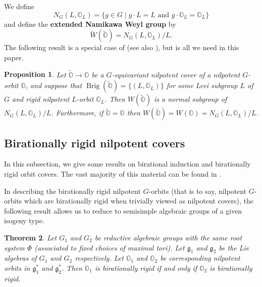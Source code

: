 \documentclass[11pt]{amsart}
\renewcommand{\O}{{\mathbb O}}
\newcommand{\g}{{\mathfrak g}}
\newcommand{\Brig}{\operatorname{Brig}}
\newcommand{\covO}{\widetilde{\O}}
\newtheorem{theorem}{Theorem}[section]
\newtheorem{prop}[theorem]{Proposition}
\numberwithin{equation}{section}
\begin{document}
	We define $$N_G(L,\O_L)=\{g\in G\mid g\cdot L=L\mbox{ and } g\cdot\O_L=\O_L\}$$ and define the {\bf extended Namikawa Weyl group} by $$\widetilde{W}(\covO)=N_G(L,\O_L)/L.$$ The following result is a special case of \cite[Proposition 7.2.2]{LMM} (see also \cite{Lo22}), but is all we need in this paper.
	
	\begin{prop}\label{p: NamW}
		Let $\covO\to \O$ be a $G$-equivariant nilpotent cover of a nilpotent $G$-orbit $\O$, and suppose that $\Brig(\covO)=\{(L,\O_L)\}$ for some Levi subgroup $L$ of $G$ and rigid nilpotent $L$-orbit $\O_L$. Then $W(\covO)$ is a normal subgroup of $N_G(L,\O_L)/L$. Furthermore, if $\covO=\O$ then $W(\covO)=W(\O)=N_G(L,\O_L)/L$. 
	\end{prop}
	
	
	
	\subsection{Birationally rigid nilpotent covers}\label{ss brnc}
	
	In this subsection, we give some results on birational induction and birationally rigid orbit covers. The vast majority of this material can be found in \cite{LMM,MM,MMY}.
	
	In describing the birationally rigid nilpotent $G$-orbits (that is to say, nilpotent $G$-orbits which are birationally rigid when trivially viewed as nilpotent covers), the following result allows us to reduce to semisimple algebraic groups of a given isogeny type.
	
	\begin{theorem}\label{th: isogindep}
		Let $G_1$ and $G_2$ be reductive algebraic groups with the same root system $\Phi$ (associated to fixed choices of maximal tori). Let $\g_1$ and $\g_2$ be the Lie algebras of $G_1$ and $G_2$ respectively. Let $\O_1$ and $\O_2$ be corresponding nilpotent orbits in $\g_1^{*}$ and $\g_2^{*}$. Then $\O_1$ is birationally rigid if and only if $\O_2$ is birationally rigid.
	\end{theorem}
	
\end{document}
